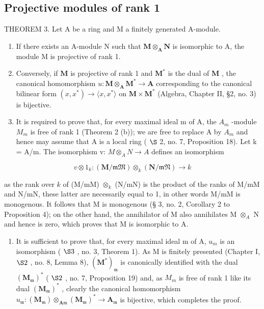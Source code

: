 \subsection{Projective modules of rank 1}

THEOREM 3. Let A be a ring and M a finitely generated A-module.

\begin{enumerate}
\def\labelenumi{(\roman{enumi})}
\item
  If there exists an A-module N such that \(\mathbf{M} \otimes_{\mathbf{A}} \mathbf{N}\) is isomorphic to A, the module M is projective of rank 1.
\item
  Conversely, if \(\mathbf{M}\) is projective of rank 1 and \(\mathbf{M}^*\) is the dual of \(\mathbf{M}\) , the canonical homomorphism \(u: \mathbf{M} \otimes_{\mathbf{A}} \mathbf{M}^* \to \mathbf{A}\) corresponding to the canonical bilinear form \((x, x^*) \to \langle x, x^* \rangle\) on \(\mathbf{M} \times \mathbf{M}^*\) (Algebra, Chapter II, §2, no. 3) is bijective.
\item
  It is required to prove that, for every maximal ideal m of A, the \(A_{m}\) -module \(M_{m}\) is free of rank 1 (Theorem 2 (b)); we are free to replace A by \(A_{m}\) and hence may assume that A is a local ring ( \(\S\) 2, no. 7, Proposition 18). Let k = A/m. The isomorphism v: \(M \otimes_{A} N \to A\) defines an isomorphism
\end{enumerate}

\[
v \otimes 1 _ {k} \colon (\mathbf {M} / \mathfrak {m M}) \otimes_ {k} (\mathbf {N} / \mathfrak {m N}) \rightarrow k
\]

as the rank over \(k\) of (M/mM) \(\otimes_k\) (N/mN) is the product of the ranks of M/mM and N/mN, these latter are necessarily equal to 1, in other words M/mM is monogenous. It follows that M is monogenous (§ 3, no. 2, Corollary 2 to Proposition 4); on the other hand, the annihilator of M also annihilates M \(\otimes_A\) N and hence is zero, which proves that M is isomorphic to A.

\begin{enumerate}
\def\labelenumi{(\roman{enumi})}
\setcounter{enumi}{1}
\tightlist
\item
  It is sufficient to prove that, for every maximal ideal m of A, \(u_{m}\) is an isomorphism ( \(\S 3\) , no. 3, Theorem 1). As M is finitely presented (Chapter I, \(\S 2\) , no. 8, Lemma 8), \((\mathbf{M}^{*})_{\mathfrak{m}}\) is canonically identified with the dual \((\mathbf{M}_{\mathfrak{m}})^{*}\) ( \(\S 2\) , no. 7, Proposition 19) and, as \(M_{m}\) is free of rank 1 like its dual \((\mathbf{M}_{\mathfrak{m}})^{*}\) , clearly the canonical homomorphism \(u_{\mathfrak{m}}: (\mathbf{M}_{\mathfrak{m}}) \otimes_{\mathbf{A}\mathfrak{m}} (\mathbf{M}_{\mathfrak{m}})^{*} \to \mathbf{A}_{\mathfrak{m}}\) is bijective, which completes the proof.
\end{enumerate}

